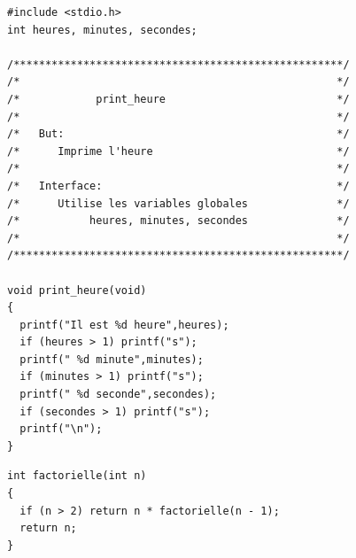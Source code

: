 \documentclass[12pt,version=final,space=onehalf,localtocs,localbibs]{yathesis}
\begin{document}
\begin{lstlisting}[caption={Il est l'heure}]
#include <stdio.h>
int heures, minutes, secondes;

/****************************************************/
/*                                                  */
/*            print_heure                           */
/*                                                  */
/*   But:                                           */
/*      Imprime l'heure                             */
/*                                                  */
/*   Interface:                                     */
/*      Utilise les variables globales              */
/*           heures, minutes, secondes              */
/*                                                  */
/****************************************************/

void print_heure(void)
{
  printf("Il est %d heure",heures);
  if (heures > 1) printf("s");
  printf(" %d minute",minutes);
  if (minutes > 1) printf("s");
  printf(" %d seconde",secondes);
  if (secondes > 1) printf("s");
  printf("\n");
}
\end{lstlisting}
\begin{lstlisting}[caption={Factorielle}]
int factorielle(int n)
{
  if (n > 2) return n * factorielle(n - 1);
  return n;
}
\end{lstlisting}
%
\backmatter
%
\printglossary
%
\printindex
%
\tableofcontents
%
\makebackcover
%
\end{document}
